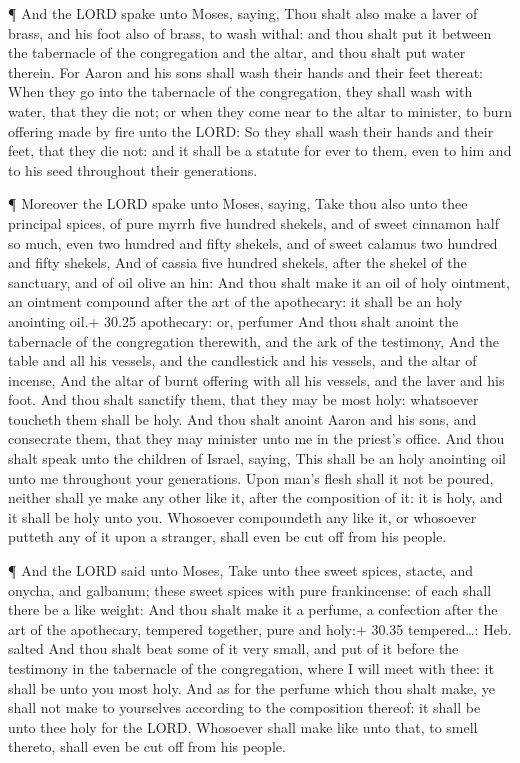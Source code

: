  ¶ And the LORD spake unto Moses, saying, 
Thou shalt also make a laver of brass, and his foot also of brass, to
wash withal: and thou shalt put it between the tabernacle of the
congregation and the altar, and thou shalt put water therein.
 For Aaron and his sons shall wash their hands and their
feet thereat:  When they go into the tabernacle of the
congregation, they shall wash with water, that they die not; or when
they come near to the altar to minister, to burn offering made by fire
unto the LORD:  So they shall wash their hands and their
feet, that they die not: and it shall be a statute for ever to them,
even to him and to his seed throughout their generations.

 ¶ Moreover the LORD spake unto Moses, saying,
 Take thou also unto thee principal spices, of pure myrrh
five hundred shekels, and of sweet cinnamon half so much, even two
hundred and fifty shekels, and of sweet calamus two hundred and fifty
shekels,  And of cassia five hundred shekels, after the
shekel of the sanctuary, and of oil olive an hin:  And thou
shalt make it an oil of holy ointment, an ointment compound after the
art of the apothecary: it shall be an holy anointing oil.+ 30.25
apothecary: or, perfumer  And thou shalt anoint the
tabernacle of the congregation therewith, and the ark of the testimony,
 And the table and all his vessels, and the candlestick and
his vessels, and the altar of incense,  And the altar of
burnt offering with all his vessels, and the laver and his foot.
 And thou shalt sanctify them, that they may be most holy:
whatsoever toucheth them shall be holy.  And thou shalt
anoint Aaron and his sons, and consecrate them, that they may minister
unto me in the priest's office.  And thou shalt speak unto
the children of Israel, saying, This shall be an holy anointing oil unto
me throughout your generations.  Upon man's flesh shall it
not be poured, neither shall ye make any other like it, after the
composition of it: it is holy, and it shall be holy unto you.
 Whosoever compoundeth any like it, or whosoever putteth
any of it upon a stranger, shall even be cut off from his people.

 ¶ And the LORD said unto Moses, Take unto thee sweet
spices, stacte, and onycha, and galbanum; these sweet spices with pure
frankincense: of each shall there be a like weight:  And
thou shalt make it a perfume, a confection after the art of the
apothecary, tempered together, pure and holy:+ 30.35 tempered\ldots:
Heb. salted  And thou shalt beat some of it very small, and
put of it before the testimony in the tabernacle of the congregation,
where I will meet with thee: it shall be unto you most holy.
 And as for the perfume which thou shalt make, ye shall not
make to yourselves according to the composition thereof: it shall be
unto thee holy for the LORD.  Whosoever shall make like
unto that, to smell thereto, shall even be cut off from his people.

